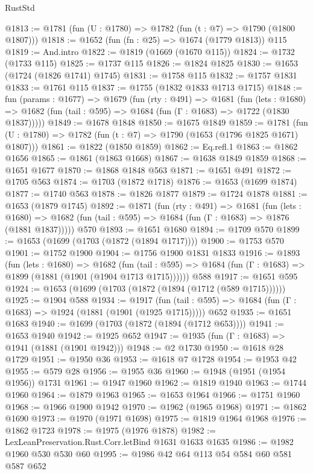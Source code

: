 \begin{lexlean}{RustStd}
\begin{coremodule}
{\begin{coremodule}
{{{{{{{{{{{{{{{{@1813 := @1781 (fun (U : @1780) => @1782 (fun (t : @7) => @1790 (@1800 @1807)))
@1818 := @1652 (fun (fn : @25) => @1674 (@1779 @1813)) @115
@1819 := And.intro
@1822 := @1819 (@1669 (@1670 @115))
@1824 := @1732 (@1733 @115)
@1825 := @1737 @115
@1826 := @1824 @1825
@1830 := @1653 (@1724 (@1826 @1741) @1745)
@1831 := @1758 @115
@1832 := @1757 @1831
@1833 := @1761 @115
@1837 := @1755 (@1832 @1833 @1713 @1715)
@1848 := fun (params : @1677) =>
  @1679
    (fun (rty : @491) =>
    @1681
      (fun (lets : @1680) =>
      @1682 (fun (tail : @595) => @1684 (fun (Γ : @1683) => @1722 (@1830 @1837)))))
@1849 := @1678 @1848
@1850 := @1675 @1849
@1859 := @1781 (fun (U : @1780) => @1782 (fun (t : @7) => @1790 (@1653 (@1796 @1825 @1671) @1807)))
@1861 := @1822 (@1850 @1859)
@1862 := Eq.refl.{1}
@1863 := @1862 @1656
@1865 := @1861 (@1863 @1668)
@1867 := @1638 @1849 @1859
@1868 := @1651 @1677
@1870 := @1868 @1848 @563
@1871 := @1651 @491
@1872 := @1705 @563
@1874 := @1703 (@1872 @1718)
@1876 := @1653 (@1699 @1874)
@1877 := @1740 @563
@1878 := @1826 @1877
@1879 := @1724 @1878
@1881 := @1653 (@1879 @1745)
@1892 := @1871
    (fun (rty : @491) =>
    @1681
      (fun (lets : @1680) =>
      @1682 (fun (tail : @595) => @1684 (fun (Γ : @1683) => @1876 (@1881 @1837)))))
    @570
@1893 := @1651 @1680
@1894 := @1709 @570
@1899 := @1653 (@1699 (@1703 (@1872 (@1894 @1717))))
@1900 := @1753 @570
@1901 := @1752 @1900
@1904 := @1756 @1900 @1831 @1833
@1916 := @1893
    (fun (lets : @1680) =>
    @1682
      (fun (tail : @595) => @1684 (fun (Γ : @1683) => @1899 (@1881 (@1901 (@1904 @1713 @1715))))))
    @588
@1917 := @1651 @595
@1924 := @1653 (@1699 (@1703 (@1872 (@1894 (@1712 (@589 @1715))))))
@1925 := @1904 @588
@1934 := @1917
    (fun (tail : @595) => @1684 (fun (Γ : @1683) => @1924 (@1881 (@1901 (@1925 @1715)))))
    @652
@1935 := @1651 @1683
@1940 := @1699 (@1703 (@1872 (@1894 (@1712 @653))))
@1941 := @1653 @1940
@1942 := @1925 @652
@1947 := @1935 (fun (Γ : @1683) => @1941 (@1881 (@1901 @1942)))
@1948 := @2 @1730
@1950 := @1618 @28 @1729
@1951 := @1950 @36
@1953 := @1618 @7 @1728
@1954 := @1953 @42
@1955 := @579 @28
@1956 := @1955 @36
@1960 := @1948 (@1951 (@1954 @1956)) @1731
@1961 := @1947 @1960
@1962 := @1819 @1940
@1963 := @1744 @1960
@1964 := @1879 @1963
@1965 := @1653 @1964
@1966 := @1751 @1960
@1968 := @1966 @1900 @1942
@1970 := @1962 (@1965 @1968)
@1971 := @1862 @1690
@1973 := @1970 (@1971 @1698)
@1975 := @1819 @1964 @1968
@1976 := @1862 @1723
@1978 := @1975 (@1976 @1878)
@1982 := LexLeanPreservation.Rust.Corr.letBind @1631 @1633 @1635
@1986 := @1982 @1960 @530 @530 @60
@1995 := @1986 @42 @64 @113 @54 @584 @60 @581 @587 @652
}}}}}}}}}}}}}}}}
\end{coremodule}}
\end{coremodule}
\end{lexlean}
